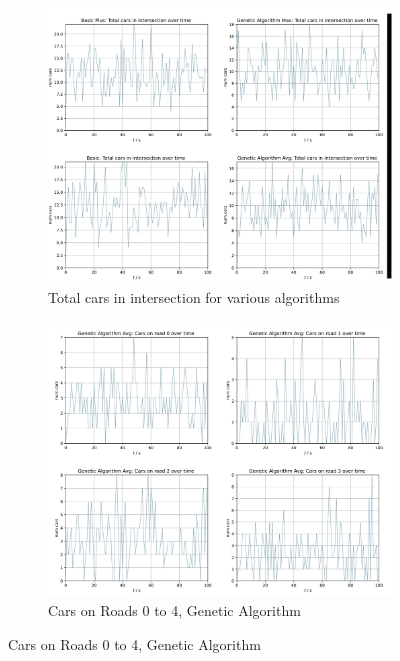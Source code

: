 \documentclass{article}
\begin{document}
\FloatBarrier
\begin{figure}[h]
\centering
\begin{subfigure}{0.49\textwidth}
\centering
\includegraphics[width = \textwidth]{graph1.png}
\caption{Total cars in intersection for various algorithms}
\label{fig:left}
\end{subfigure}
\begin{subfigure}{0.49\textwidth}
\centering
\includegraphics[width = \textwidth]{graph2.png}
\caption{Cars on Roads 0 to 4, Genetic Algorithm}
\label{fig:right}
\end{subfigure}
\label{fig:combined}
\end{figure}
\end{document}
